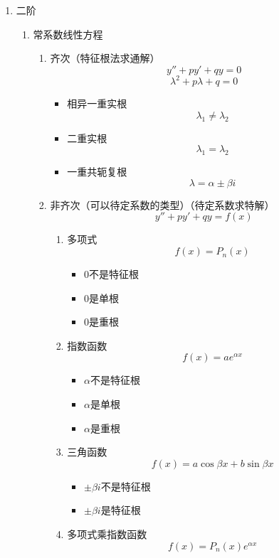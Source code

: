 \documentclass[UTF8]{ctexart}
\begin{document}
\begin{enumerate}
\begin{enumerate}
\begin{enumerate}
\end{enumerate}
    \end{enumerate}
    \item 二阶
    \begin{enumerate}
        \item 常系数线性方程
        \begin{enumerate}
            \item 齐次（特征根法求通解）\[y''+py'+qy=0\]\[\lambda ^2+p\lambda+q=0\]
            \begin{itemize}
                \item 相异一重实根\[\lambda _1 \neq \lambda _2\]
                \item 二重实根\[\lambda _1 = \lambda _2\]
                \item 一重共轭复根\[\lambda = \alpha \pm \beta i\]
            \end{itemize}
            \item 非齐次（可以待定系数的类型）（待定系数求特解）\[y''+py'+qy=f(x)\]
            \begin{enumerate}
                \item 多项式\[f(x)=P_n(x)\]
                \begin{itemize}
                    \item 0不是特征根
                    \item 0是单根
                    \item 0是重根
                \end{itemize}
                \item 指数函数\[f(x)=ae^{\alpha x}\]
                \begin{itemize}
                    \item \(\alpha\)不是特征根
                    \item \(\alpha\)是单根
                    \item \(\alpha\)是重根
                \end{itemize}
                \item 三角函数\[f(x)=a\cos \beta x +b\sin \beta x\]
                \begin{itemize}
                    \item \(\pm \beta i\)不是特征根
                    \item \(\pm \beta i\)是特征根
                \end{itemize}
                \item 多项式乘指数函数\[f(x)=P_n(x)e^{\alpha x}\]

\end{enumerate}
\end{enumerate}
\end{enumerate}
\end{enumerate}
\end{document}
